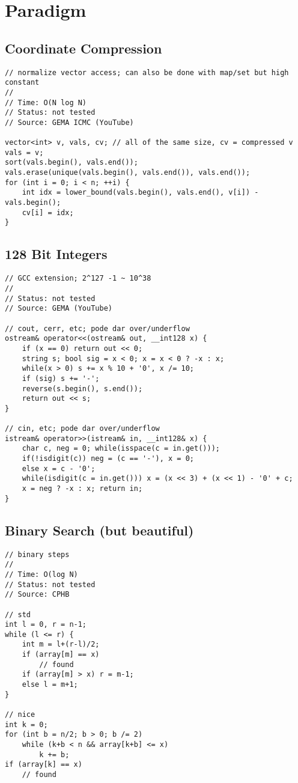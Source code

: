 \documentclass[12pt, a4paper, twoside]{article}
\begin{document}
\section{Paradigm}

\subsection{Coordinate Compression}
\begin{lstlisting}
// normalize vector access; can also be done with map/set but high constant
//
// Time: O(N log N)
// Status: not tested
// Source: GEMA ICMC (YouTube)

vector<int> v, vals, cv; // all of the same size, cv = compressed v
vals = v;
sort(vals.begin(), vals.end());
vals.erase(unique(vals.begin(), vals.end()), vals.end());
for (int i = 0; i < n; ++i) {
	int idx = lower_bound(vals.begin(), vals.end(), v[i]) - vals.begin();
	cv[i] = idx;
}
\end{lstlisting}

\subsection{128 Bit Integers}
\begin{lstlisting}
// GCC extension; 2^127 -1 ~ 10^38
//
// Status: not tested
// Source: GEMA (YouTube)

// cout, cerr, etc; pode dar over/underflow
ostream& operator<<(ostream& out, __int128 x) {
    if (x == 0) return out << 0;
    string s; bool sig = x < 0; x = x < 0 ? -x : x;
    while(x > 0) s += x % 10 + '0', x /= 10;
    if (sig) s += '-';
    reverse(s.begin(), s.end());
    return out << s;
}

// cin, etc; pode dar over/underflow
istream& operator>>(istream& in, __int128& x) {
    char c, neg = 0; while(isspace(c = in.get()));
    if(!isdigit(c)) neg = (c == '-'), x = 0;
    else x = c - '0';
    while(isdigit(c = in.get())) x = (x << 3) + (x << 1) - '0' + c;
    x = neg ? -x : x; return in;
}
\end{lstlisting}

\subsection{Binary Search (but beautiful)}
\begin{lstlisting}
// binary steps
//
// Time: O(log N)
// Status: not tested
// Source: CPHB

// std
int l = 0, r = n-1;
while (l <= r) {
	int m = l+(r-l)/2;
	if (array[m] == x)
		// found
	if (array[m] > x) r = m-1;
	else l = m+1;
}

// nice
int k = 0;
for (int b = n/2; b > 0; b /= 2)
	while (k+b < n && array[k+b] <= x)
		k += b;
if (array[k] == x)
	// found
\end{lstlisting}
\end{document}
